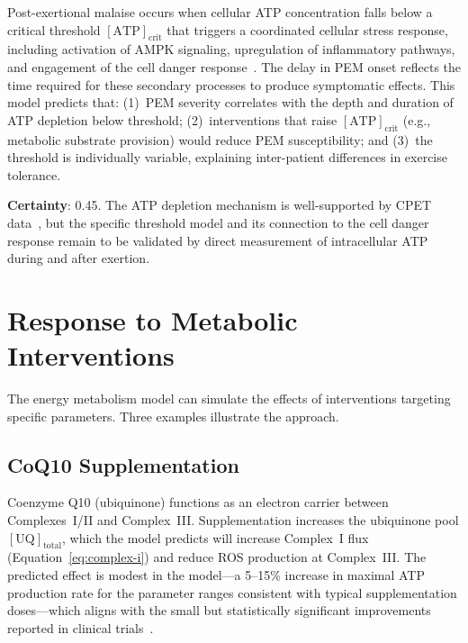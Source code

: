 \begin{hypothesis}
Post-exertional malaise occurs when cellular ATP concentration falls below a critical threshold $[\text{ATP}]_{\text{crit}}$ that triggers a coordinated cellular stress response, including activation of AMPK signaling, upregulation of inflammatory pathways, and engagement of the cell danger response~\cite{Naviaux2014cdr}. The delay in PEM onset reflects the time required for these secondary processes to produce symptomatic effects. This model predicts that: (1)~PEM severity correlates with the depth and duration of ATP depletion below threshold; (2)~interventions that raise $[\text{ATP}]_{\text{crit}}$ (e.g., metabolic substrate provision) would reduce PEM susceptibility; and (3)~the threshold is individually variable, explaining inter-patient differences in exercise tolerance.

\textbf{Certainty}: 0.45. The ATP depletion mechanism is well-supported by CPET data~\cite{keller2024cpet}, but the specific threshold model and its connection to the cell danger response remain to be validated by direct measurement of intracellular ATP during and after exertion.
\end{hypothesis}

\section{Response to Metabolic Interventions}
\label{sec:metabolic-intervention-models}

The energy metabolism model can simulate the effects of interventions targeting specific parameters. Three examples illustrate the approach.

\subsection{CoQ10 Supplementation}

Coenzyme Q10 (ubiquinone) functions as an electron carrier between Complexes~I/II and Complex~III. Supplementation increases the ubiquinone pool $[\text{UQ}]_{\text{total}}$, which the model predicts will increase Complex~I flux (Equation~\ref{eq:complex-i}) and reduce ROS production at Complex~III. The predicted effect is modest in the model---a 5--15\% increase in maximal ATP production rate for the parameter ranges consistent with typical supplementation doses---which aligns with the small but statistically significant improvements reported in clinical trials~\cite{CastroMarrero2021CoQ10}.

